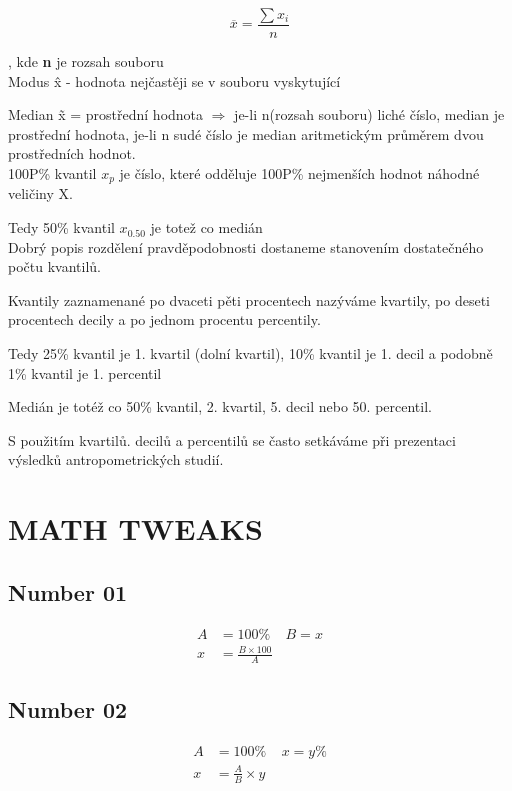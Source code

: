 \documentclass[a4paper,12pt]{article}
\begin{document}
\[
	\overline{x} = \frac{\sum x_{i}}{n}
\]

, kde \textbf{n} je rozsah souboru \\

Modus \^{x} - hodnota nejčastěji se v souboru vyskytující

Median \~{x} = prostřední hodnota  $\Rightarrow$ je-li n(rozsah souboru) 
liché číslo, median je prostřední hodnota, je-li n sudé číslo
je median aritmetickým průměrem dvou prostředních hodnot. \\

100P\% kvantil $x_{p}$ je číslo, které odděluje 100P\% nejmenších hodnot
náhodné veličiny X.

Tedy 50\% kvantil $x_{0.50}$ je totež co medián \\

Dobrý popis rozdělení pravděpodobnosti dostaneme stanovením dostatečného počtu kvantilů.

Kvantily zaznamenané po dvaceti pěti procentech nazýváme kvartily,
po deseti procentech decily a po jednom procentu percentily.

Tedy 25\% kvantil je 1. kvartil (dolní kvartil), 10\% kvantil je 1. decil a podobně 1\% 
kvantil je 1. percentil

Medián je totéž co 50\% kvantil, 2. kvartil, 5. decil nebo 50. percentil.

S použitím kvartilů. decilů a percentilů se často setkáváme při prezentaci výsledků
antropometrických studií.
 














\newpage
\section{MATH TWEAKS}


\subsection{Number 01}
\begin{align*}
	A &= 100\% ~~~~~
	B = x \\
	x &= \frac{B \times 100}{A}
\end{align*}

\subsection{Number 02}
\begin{align*}
A &= 100\% ~~~~~
x = y\% \\
x &= \frac{A}{B} \times y
\end{align*}
\end{document}
